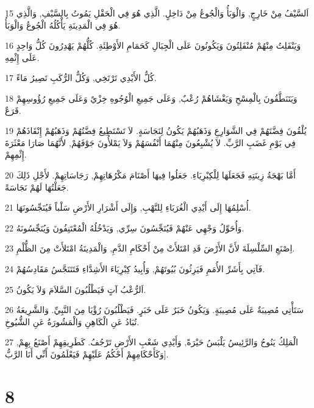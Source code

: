 \par 15 اَلسَّيْفُ مِنْ خَارِجٍ, وَالْوَبَأُ وَالْجُوعُ مِنْ دَاخِلٍ. الَّذِي هُوَ فِي الْحَقْلِ يَمُوتُ بِالسَّيْفِ, وَالَّذِي هُوَ فِي الْمَدِينَةِ يَأْكُلُهُ الْجُوعُ وَالْوَبَأُ.
\par 16 وَيَنْفَلِتُ مِنْهُمْ مُنْفَلِتُونَ وَيَكُونُونَ عَلَى الْجِبَالِ كَحَمَامِ الأَوْطِئَةِ. كُلُّهُمْ يَهْدِرُونَ كُلُّ وَاحِدٍ عَلَى إِثْمِهِ.
\par 17 كُلُّ الأَيْدِي تَرْتَخِي, وَكُلُّ الرُّكَبِ تَصِيرُ مَاءً.
\par 18 وَيَتَنَطَّقُونَ بِالْمِسْحِ وَيَغْشَاهُمْ رُعْبٌ, وَعَلَى جَمِيعِ الْوُجُوهِ خِزْيٌ وَعَلَى جَمِيعِ رُؤُوسِهِمْ قَرَعٌ.
\par 19 يُلْقُونَ فِضَّتَهُمْ فِي الشَّوَارِعِ وَذَهَبُهُمْ يَكُونُ لِنَجَاسَةٍ. لاَ تَسْتَطِيعُ فِضَّتُهُمْ وَذَهَبُهُمْ إِنْقَاذَهُمْ فِي يَوْمِ غَضَبِ الرَّبِّ. لاَ يُشْبِعُونَ مِنْهُمَا أَنْفُسَهُمْ وَلاَ يَمْلأُونَ جَوْفَهُمْ, لأَنَّهُمَا صَارَا مَعْثَرَةَ إِثْمِهِمْ.
\par 20 أَمَّا بَهْجَةُ زِينَتِهِ فَجَعَلَهَا لِلْكِبْرِيَاءِ. جَعَلُوا فِيهَا أَصْنَامَ مَكْرُهَاتِهِمْ, رَجَاسَاتِهِمْ. لأَجْلِ ذَلِكَ جَعَلْتُهَا لَهُمْ نَجَاسَةً.
\par 21 أُسْلِمُهَا إِلَى أَيْدِي الْغُرَبَاءِ لِلنَّهْبِ, وَإِلَى أَشْرَارِ الأَرْضِ سَلْباً فَيُنَجِّسُونَهَا.
\par 22 وَأُحَوِّلُ وَجْهِي عَنْهُمْ فَيُنَجِّسُونَ سِرِّي, وَيَدْخُلُهُ الْمُعْتَنِفُونَ وَيُنَجِّسُونَهُ.
\par 23 اِصْنَعِ السِّلْسِلَةَ لأَنَّ الأَرْضَ قَدِ امْتَلأَتْ مِنْ أَحْكَامِ الدَّمِ, وَالْمَدِينَةُ امْتَلأَتْ مِنَ الظُّلْمِ.
\par 24 فَآتِي بِأَشَرِّ الأُمَمِ فَيَرِثُونَ بُيُوتَهُمْ, وَأُبِيدُ كِبْرِيَاءَ الأَشِدَّاءِ فَتَتَنَجَّسُ مَقَادِسُهُمْ.
\par 25 اَلرُّعْبُ آتٍ فَيَطْلُبُونَ السَّلاَمَ وَلاَ يَكُونُ.
\par 26 سَتَأْتِي مُصِيبَةٌ عَلَى مُصِيبَةٍ. وَيَكُونُ خَبَرٌ عَلَى خَبَرٍ. فَيَطْلُبُونَ رُؤْيَا مِنَ النَّبِيِّ. وَالشَّرِيعَةُ تُبَادُ عَنِ الْكَاهِنِ وَالْمَشُورَةُ عَنِ الشُّيُوخِ.
\par 27 الْمَلِكُ يَنُوحُ وَالرَّئِيسُ يَلْبَسُ حَيْرَةً, وَأَيْدِي شَعْبِ الأَرْضِ تَرْجُفُ. كَطَرِيقِهِمْ أَصْنَعُ بِهِمْ, وَكَأَحْكَامِهِمْ أَحْكُمُ عَلَيْهِمْ فَيَعْلَمُونَ أَنِّي أَنَا الرَّبُّ].

\chapter{8}

